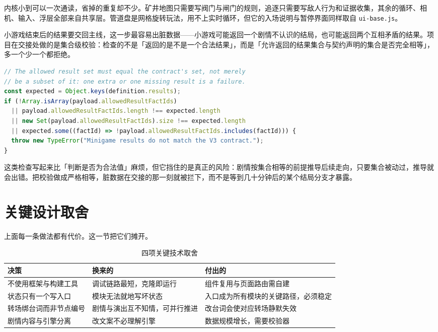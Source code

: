 内核小到可以一次通读，省掉的重复却不少。矿井地图只需要写阀门与闸门的规则，追逐只需要写敌人行为和证据收集，其余的循环、相机、输入、浮层全部来自共享层。管道盘是网格旋转玩法，用不上实时循环，但它的入场说明与暂停界面同样取自 \texttt{ui-base.js}。

小游戏结束后的结果要交回主线，这一步最容易出脏数据——小游戏可能返回一个剧情不认识的结局，也可能返回两个互相矛盾的结果。项目在交接处做的是集合级校验：检查的不是「返回的是不是一个合法结果」，而是「允许返回的结果集合与契约声明的集合是否完全相等」，多一个少一个都拒绝。

\begin{lstlisting}[language=JavaScript, caption={小游戏结果的集合级校验}, label={lst:gateway}]
// The allowed result set must equal the contract's set, not merely
// be a subset of it: one extra or one missing result is a failure.
const expected = Object.keys(definition.results);
if (!Array.isArray(payload.allowedResultFactIds)
  || payload.allowedResultFactIds.length !== expected.length
  || new Set(payload.allowedResultFactIds).size !== expected.length
  || expected.some((factId) => !payload.allowedResultFactIds.includes(factId))) {
  throw new TypeError("Minigame results do not match the V3 contract.");
}
\end{lstlisting}

这类检查写起来比「判断是否为合法值」麻烦，但它挡住的是真正的风险：剧情按集合相等的前提推导后续走向，只要集合被动过，推导就会出错。把校验做成严格相等，脏数据在交接的那一刻就被拦下，而不是等到几十分钟后的某个结局分支才暴露。

\section{关键设计取舍}

上面每一条做法都有代价。这一节把它们摊开。

\begin{table}[htbp]
\centering
\caption{四项关键技术取舍}
\label{tab:tradeoffs}
\small
\begin{tabularx}{\linewidth}{@{}l X X@{}}
\toprule
决策 & 换来的 & 付出的 \\
\midrule
不使用框架与构建工具 &
调试链路最短，克隆即运行 &
组件复用与页面路由需自建 \\ \addlinespace
状态只有一个写入口 &
模块无法就地写坏状态 &
入口成为所有模块的关键路径，必须稳定 \\ \addlinespace
转场绑台词而非节点编号 &
剧情与演出互不知情，可并行推进 &
改台词会使对应转场静默失效 \\ \addlinespace
剧情内容与引擎分离 &
改文案不必理解引擎 &
数据规模增长，需要校验器 \\
\bottomrule
\end{tabularx}
\end{table}

